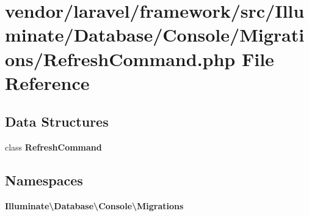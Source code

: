 \section{vendor/laravel/framework/src/\+Illuminate/\+Database/\+Console/\+Migrations/\+Refresh\+Command.php File Reference}
\label{_refresh_command_8php}
\subsection*{Data Structures}
\begin{DoxyCompactItemize}
\item 
class {\bf Refresh\+Command}
\end{DoxyCompactItemize}
\subsection*{Namespaces}
\begin{DoxyCompactItemize}
\item 
 {\bf Illuminate\textbackslash{}\+Database\textbackslash{}\+Console\textbackslash{}\+Migrations}
\end{DoxyCompactItemize}
